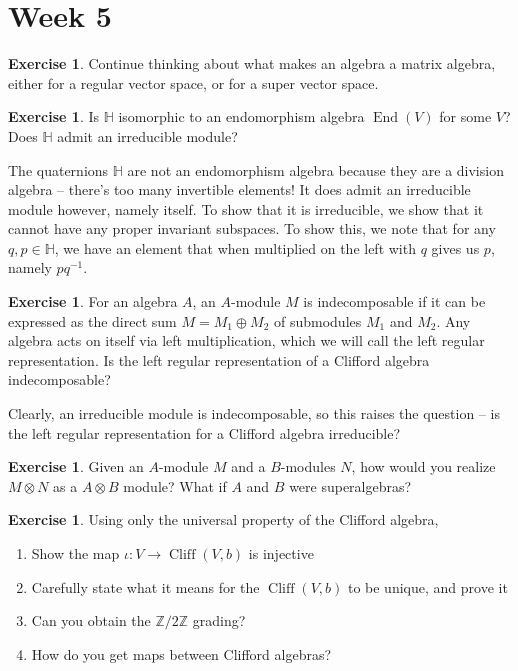 \documentclass[psamsfonts]{amsart}
\theoremstyle{definition}
\newtheorem{exer}[thm]{Exercise}
\theoremstyle{remark}
\newcommand{\Z}{\mathbb{Z}}
\newcommand{\inv}{^{-1}}
\DeclareMathOperator{\End}{End}
\DeclareMathOperator{\Cliff}{Cliff}
\begin{document}
\section*{Week 5}
%
\begin{exer}
Continue thinking about what makes an algebra a matrix algebra, either for a regular vector space, or for a super vector space.
\end{exer}
%
\begin{exer}
Is $\mathbb{H}$ isomorphic to an endomorphism algebra $\End(V)$ for some $V$? Does $\mathbb{H}$ admit an irreducible module?
\end{exer}
The quaternions $\mathbb{H}$ are not an endomorphism algebra because they are a division algebra -- there's too many invertible elements! It does admit an irreducible module however, namely itself. To show that it is irreducible, we show that it cannot have any proper invariant subspaces. To show this, we note that for any $q,p \in \mathbb{H}$, we have an element that when multiplied on the left with $q$ gives us $p$, namely $pq\inv$.
%
\begin{exer}
For an algebra $A$, an $A$-module $M$ is indecomposable if it can be expressed as the direct sum
$M = M_1 \oplus M_2$ of submodules $M_1$ and $M_2$. Any algebra acts on itself via left multiplication, which we will call the left regular representation. Is the left regular representation of a Clifford algebra indecomposable?
\end{exer}
Clearly, an irreducible module is indecomposable, so this raises the question -- is the left regular representation for a Clifford algebra irreducible?
%
\begin{exer}
Given an $A$-module $M$ and a $B$-modules $N$, how would you realize $M \otimes N$ as a $A \otimes B$ module? What if $A$ and $B$ were superalgebras?
\end{exer}
%
\begin{exer}
Using only the universal property of the Clifford algebra,
\begin{enumerate}
\item Show the map $\iota : V \to \Cliff(V,b)$ is injective
\item Carefully state what it means for the $\Cliff(V,b)$ to be unique, and prove it
\item Can you obtain the $\Z/2\Z$ grading?
\item How do you get maps between Clifford algebras?
\end{enumerate}
\end{exer}
\end{document}
